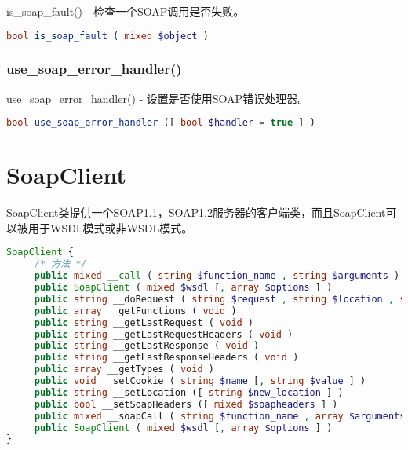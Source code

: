is\_soap\_fault() - 检查一个SOAP调用是否失败。

\begin{lstlisting}[language=PHP]
bool is_soap_fault ( mixed $object )
\end{lstlisting}


\subsection{use\_soap\_error\_handler()}

use\_soap\_error\_handler() - 设置是否使用SOAP错误处理器。




\begin{lstlisting}[language=PHP]
bool use_soap_error_handler ([ bool $handler = true ] )
\end{lstlisting}



\chapter{SoapClient}

SoapClient类提供一个SOAP1.1，SOAP1.2服务器的客户端类，而且SoapClient可以被用于WSDL模式或非WSDL模式。

\begin{lstlisting}[language=PHP]
SoapClient {
     /* 方法 */
     public mixed __call ( string $function_name , string $arguments )
     public SoapClient ( mixed $wsdl [, array $options ] )
     public string __doRequest ( string $request , string $location , string $action , int $version [, int $one_way = 0 ] )
     public array __getFunctions ( void )
     public string __getLastRequest ( void )
     public string __getLastRequestHeaders ( void )
     public string __getLastResponse ( void )
     public string __getLastResponseHeaders ( void )
     public array __getTypes ( void )
     public void __setCookie ( string $name [, string $value ] )
     public string __setLocation ([ string $new_location ] )
     public bool __setSoapHeaders ([ mixed $soapheaders ] )
     public mixed __soapCall ( string $function_name , array $arguments [, array $options [, mixed $input_headers [, array &$output_headers ]]] )
     public SoapClient ( mixed $wsdl [, array $options ] )
}
\end{lstlisting}




\begin{lstlisting}[language=PHP]

\end{lstlisting}

